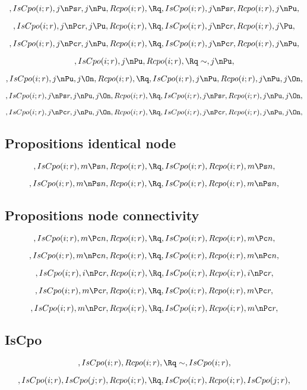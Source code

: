 \[, IsCpo(i;r), j \nPs r, j \nPu, Rcpo(i;r), \Rq , IsCpo(i;r), j \nPs r, Rcpo(i;r), j \nPu,\]

\[, IsCpo(i;r), j \nPc r, j \Pu, Rcpo(i;r), \Rq , IsCpo(i;r), j \nPc r, Rcpo(i;r), j \Pu,\]

\[, IsCpo(i;r), j \nPc r, j \nPu, Rcpo(i;r), \Rq , IsCpo(i;r), j \nPc r, Rcpo(i;r), j \nPu,\]

\[, IsCpo(i;r), j \nPu, Rcpo(i;r), \Rq \sim, j \nPu,\]

\[, IsCpo(i;r), j \nPu, j \On, Rcpo(i;r), \Rq , IsCpo(i;r), j \nPu, Rcpo(i;r), j \nPu, j \On,\]

\[, IsCpo(i;r), j \nPs r, j \nPu, j \On, Rcpo(i;r), \Rq , IsCpo(i;r),  j \nPs r, Rcpo(i;r), j \nPu, j \On,\]

\[, IsCpo(i;r), j \nPc r, j \nPu, j \On, Rcpo(i;r), \Rq , IsCpo(i;r),  j \nPc r, Rcpo(i;r), j \nPu, j \On,\]


\bigskip
\bigskip
\subsection{Propositions identical node}
\[, IsCpo(i;r), m \Ps n, Rcpo(i;r), \Rq , IsCpo(i;r), Rcpo(i;r), m \Ps n,\]

\[, IsCpo(i;r), m \nPs n, Rcpo(i;r), \Rq , IsCpo(i;r), Rcpo(i;r), m \nPs n,\]



\bigskip
\bigskip
\subsection{Propositions  node connectivity}
\[, IsCpo(i;r), m \Pc n, Rcpo(i;r), \Rq , IsCpo(i;r), Rcpo(i;r), m \Pc n,\]

\[, IsCpo(i;r), m \nPc n, Rcpo(i;r), \Rq , IsCpo(i;r), Rcpo(i;r), m \nPc n,\]

\[, IsCpo(i;r), i \nPc r, Rcpo(i;r), \Rq , IsCpo(i;r), Rcpo(i;r), i \nPc r,\]

\[, IsCpo(i;r), m \Pc r, Rcpo(i;r), \Rq , IsCpo(i;r), Rcpo(i;r), m \Pc r,\]

\[, IsCpo(i;r), m \nPc r, Rcpo(i;r), \Rq , IsCpo(i;r), Rcpo(i;r), m \nPc r,\]




\bigskip
\bigskip
\subsection{IsCpo}
\[, IsCpo(i;r), Rcpo(i;r), \Rq \sim, IsCpo(i;r), \]

\[, IsCpo(i;r), IsCpo(j;r), Rcpo(i;r), \Rq , IsCpo(i;r), Rcpo(i;r), IsCpo(j;r), \]

